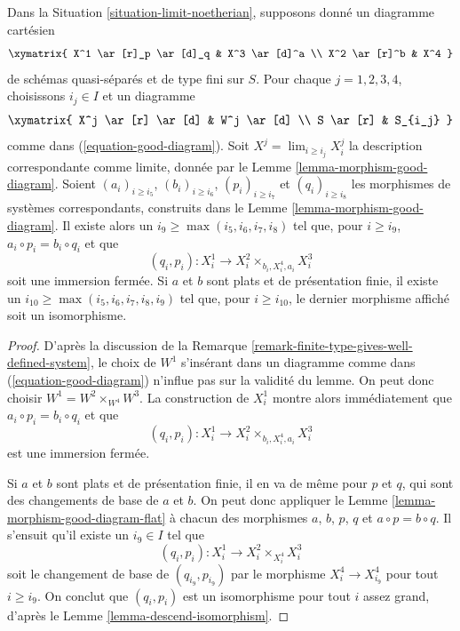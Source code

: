 \begin{lemma}
\label{lemma-good-diagram-fibre-product}
Dans la Situation \ref{situation-limit-noetherian}, supposons donné un
diagramme cartésien
$$
\xymatrix{
X^1 \ar[r]_p \ar[d]_q & X^3 \ar[d]^a \\
X^2 \ar[r]^b & X^4
}
$$
de schémas quasi-séparés et de type fini sur $S$.
Pour chaque $j = 1, 2, 3, 4$, choisissons $i_j \in I$ et un diagramme
$$
\xymatrix{
X^j \ar[r] \ar[d] & W^j \ar[d] \\
S \ar[r] & S_{i_j}
}
$$
comme dans (\ref{equation-good-diagram}). Soit
$X^j = \lim_{i \geq i_j} X^j_i$ la description correspondante comme limite,
donnée par le Lemme \ref{lemma-morphism-good-diagram}.
Soient $(a_i)_{i \geq i_5}$, $(b_i)_{i \geq i_6}$, $(p_i)_{i \geq i_7}$ et
$(q_i)_{i \geq i_8}$ les morphismes de systèmes correspondants, construits
dans le Lemme \ref{lemma-morphism-good-diagram}. Il existe alors un
$i_9 \geq \max(i_5, i_6, i_7, i_8)$ tel que, pour $i \geq i_9$,
$a_i \circ p_i = b_i \circ q_i$ et que
$$
(q_i, p_i) : X^1_i \longrightarrow X^2_i \times_{b_i, X^4_i, a_i} X^3_i
$$
soit une immersion fermée.
Si $a$ et $b$ sont plats et de présentation finie, il existe un
$i_{10} \geq \max(i_5, i_6, i_7, i_8, i_9)$ tel que, pour $i \geq i_{10}$,
le dernier morphisme affiché soit un isomorphisme.
\end{lemma}

\begin{proof}
D'après la discussion de la
Remarque \ref{remark-finite-type-gives-well-defined-system},
le choix de $W^1$ s'insérant dans un diagramme comme dans
(\ref{equation-good-diagram}) n'influe pas sur la validité
du lemme. On peut donc choisir $W^1 = W^2 \times_{W^4} W^3$.
La construction de $X^1_i$ montre alors immédiatement que
$a_i \circ p_i = b_i \circ q_i$ et que
$$
(q_i, p_i) : X^1_i \longrightarrow X^2_i \times_{b_i, X^4_i, a_i} X^3_i
$$
est une immersion fermée.

\medskip\noindent
Si $a$ et $b$ sont plats et de présentation finie, il en va de même pour
$p$ et $q$, qui sont des changements de base de $a$ et $b$. On peut donc appliquer le
Lemme \ref{lemma-morphism-good-diagram-flat}
à chacun des morphismes $a$, $b$, $p$, $q$ et $a \circ p = b \circ q$.
Il s'ensuit qu'il existe un $i_9 \in I$ tel que
$$
(q_i, p_i) : X^1_i \to X^2_i \times_{X^4_i} X^3_i
$$
soit le changement de base de $(q_{i_9}, p_{i_9})$ par le morphisme
$X^4_i \to X^4_{i_9}$ pour tout $i \geq i_9$.
On conclut que $(q_i, p_i)$ est un isomorphisme pour tout
$i$ assez grand, d'après le Lemme \ref{lemma-descend-isomorphism}.
\end{proof}













